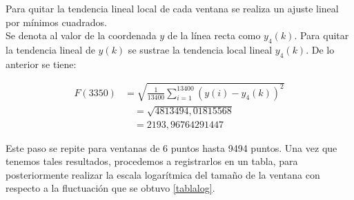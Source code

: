 \documentclass[letterpaper,titlepage,12pt,draft]{report}
\begin{document}
Para quitar la tendencia lineal local de cada ventana se realiza un ajuste lineal por m\'inimos cuadrados.\\ 

Se denota al valor de la coordenada $y$ de la l\'inea recta como $y_{4}(k)$. Para quitar la tendencia lineal de $y(k)$ se sustrae la tendencia local lineal $y_{4}(k)$. De lo anterior se tiene:

\begin{equation*}
\begin{split}
F(3350) & =\sqrt{\frac{1}{13400}\sum_{i=1}^{13400}(y(i)-y_4(k))^2}\\
& \quad =\sqrt{4813494,01815568}\\
& \quad =2193,96764291447
\end{split}
\end{equation*}



Este paso se repite para ventanas de 6 puntos hasta 9494 puntos. Una vez que tenemos tales resultados, procedemos a registrarlos en un tabla, para posteriormente realizar la escala logar\'itmica del tama\~no de la ventana con respecto a la fluctuaci\'on que se obtuvo \ref{tablalog}.
\end{document}
